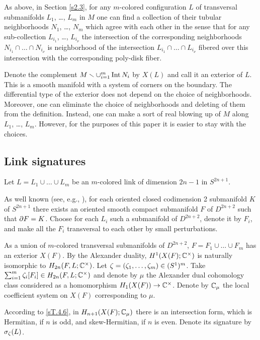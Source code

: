 \documentclass{article}
\numberwithin{equation}{section}
\begin{document}
As above, in Section \ref{s2.3}, for any $m$-colored configuration $L$ 
of transversal submanifolds $L_1$, \dots, $L_m$ in $M$ one can find a
collection of their tubular neighborhoods $N_1$, \dots, $N_m$ which agree
with each other in the sense that for any sub-collection $L_{i_1}$, \dots,
$L_{i_\nu}$ the intersection of the corresponding neighborhoods 
$N_{i_1}\cap\dots\cap N_{i_\nu}$ is neighborhood of the intersection 
$L_{i_1}\cap\dots\cap L_{i_\nu}$ fibered over this intersection with 
the corresponding poly-disk fiber. 

Denote the complement $M\smallsetminus\cup_{i=1}^m\operatorname{Int} N_i$ by $X(L)$ and call it
an {\sfit exterior\/} of $L$. This is a smooth manifold with a system of
corners on the boundary.  The differential type of the exterior does
not depend on the choice of neighborhoods. Moreover, one can eliminate the
choice of neighborhoods and deleting of them from the definition. Instead,
one can make a sort of real blowing up of $M$ along $L_1$, \dots, $L_m$.
However, for the purposes of this paper it is easier to stay with the
choices. 
 
\subsection{Link signatures}\label{s3.4}
Let $L=L_1\cup\dots\cup L_m$ be an $m$-colored link of dimension $2n-1$ in
$S^{2n+1}$. 

As well known (see, e.g., \cite{Levine1}), for each oriented closed 
codimension 2 submanifold $K$ of $S^{2n+1}$ 
there exists an oriented smooth compact submanifold 
$F$ of $D^{2n+2}$ such that $\partial F=K$. Choose for each $L_i$ such a
submanifold of $D^{2n+2}$, denote it by $F_i$, and make all the $F_i$ 
transversal to each other by small perturbations. 

As a union of $m$-colored transversal submanifolds of $D^{2n+2}$,
$F= F_1\cup \dots\cup F_m$ has an exterior $X(F)$. 
By the Alexander duality, $H^1(X(F);\mathbb C^\times)$ is naturally isomorphic to
$H_{2n}(F,L;\mathbb C^\times)$. Let $\zeta=(\zeta_1,\dots,\zeta_m)\in(S^1)^m$.
Take $\sum_{i=1}^m\zeta_i[F_i]\in H_{2n}(F,L;\mathbb C^\times)$ and denote
by $\mu$ the Alexander dual cohomology class considered as a homomorphism
$H_1(X(F))\to\mathbb C^\times$. Denote by $\mathbb C_\mu$ the local coefficient system 
on $X(F)$ corresponding to $\mu$.

According to \ref{sT.4.6}, in $H_{n+1}(X(F);\mathbb C_\mu)$ there is an 
intersection form, which is Hermitian, if $n$ is odd, and skew-Hermitian,
if $n$ is even. Denote its signature by $\sigma_\zeta(L)$.
\end{document}
